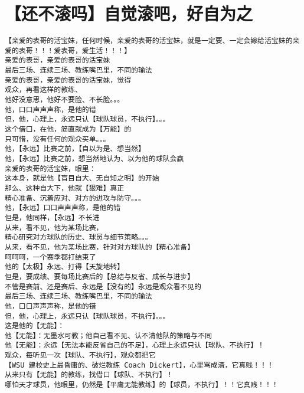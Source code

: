 \documentclass[9pt, b5paper]{article}
\begin{document}
\section{【还不滚吗】自觉滚吧，好自为之}
\label{sec-15}
\begin{verbatim}
【亲爱的表哥的活宝妹，任何时候，亲爱的表哥的活宝妹，就是一定要、一定会嫁给活宝妹的亲爱的表哥！！！爱表哥，爱生活！！！】
亲爱的表哥，亲爱的表哥的活宝妹
最后三场、连续三场、教练嘴巴里，不同的输法
亲爱的表哥，亲爱的表哥的活宝妹，觉得
观众，再看这样的教练、
他好没意思，他好不要脸、不长脸。。。
他，口口声声声称，是他的错
但，他，心理上，永远只认【球队球员，不执行】。。。
这个借口，在他，简直就成为【万能】的
只可惜，没有任何的观众买单。。。
他，【永远】比赛之前，【自以为是、想当然】
他，【永远】比赛之前，想当然地认为、以为他的球队会赢
亲爱的表哥的活宝妹，眼里：
这本身，就是他【盲目自大、无自知之明】的开始
那么、这种自大下，他就【狠难】真正
精心准备、沉着应对、对方的进攻与防守。。。
他，【永远】口口声声声称，是他的错
但是，他同样，【永远】不长进
从来，看不见，他为某场比赛，
精心研究对方球队的历史、球员与细节策略。。。
从来，看不见，他为某场比赛，针对对方球队的【精心准备】
呵呵呵，一个赛季都打结束了
他的【太极】永远、打得【天旋地转】
但是，要成绩、要每场比赛后的【总结与反省、成长与进步】
不管是赛前、还是赛后、永远是【没有的】永远是观众看不见的
最后三场、连续三场、教练嘴巴里，不同的输法
他，口口声声声称，是他的错
但，他，心理上，永远只认【球队球员，不执行】。。。
这是他的【无能】：
他【无能】：无墨水可教；他自己看不见、认不清他队的策略与不同
他【无能】：永远【无法本能反省自己的不足】，心理上永远只认【球队、不执行】！
观众，每听见一次【球队、不执行】，观众都把它
【WSU 建校史上最昏庸的、破烂教练 Coach Dickert】，心里骂成渣，它真贱！！！
从来只有【无能】的教练，找借口【球队、不执行】！
哪怕天才球员，他眼里，仍然是【平庸无能教练】的【球员，不执行】！！它真贱！！！


\end{verbatim}
\end{document}
